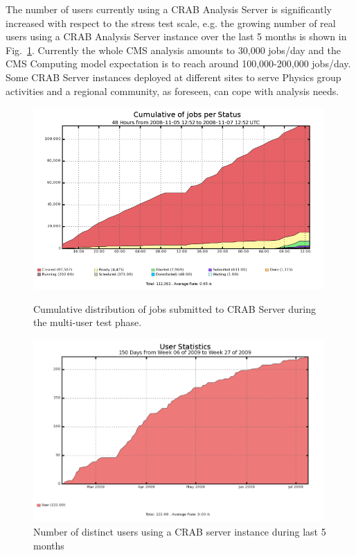 The number of users currently using a CRAB Analysis Server is significantly 
increased with respect to the stress test scale, e.g. the growing number of real users using a CRAB Analysis Server instance over the last 5 months is shown in Fig.~\ref{fig:CSusers}.
Currently the whole CMS analysis amounts to 30,000 jobs/day and the
CMS Computing model expectation is to reach around 100,000-200,000 jobs/day. 
Some CRAB Server instances deployed at different sites to serve Physics
group activities and a regional community, as foreseen, can cope with
analysis needs.
\begin{figure}
\begin{minipage}{.48\textwidth}
\centering
\includegraphics[width=0.99\textwidth]{figures/MultiUserJobStatus.png}
\caption{Cumulative distribution of jobs submitted to CRAB Server
  during the multi-user test phase. }
\label{fig:stressmulti}
\end{minipage}
\begin{minipage}{.48\textwidth}
\centering
\includegraphics[width=0.99\textwidth]{figures/CSusersLast5months.png}
\caption{Number of distinct users using a CRAB server instance during last 5 months}
\label{fig:CSusers}
\end{minipage}
\end{figure}



